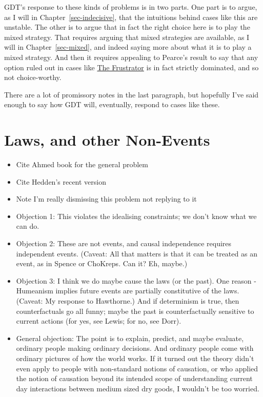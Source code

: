 \documentclass[
  12pt,
  letterpaper,
  DIV=11,
  numbers=noendperiod]{scrreprt}
\providecommand{\tightlist}{%
  \setlength{\itemsep}{0pt}\setlength{\parskip}{0pt}}\usepackage{longtable,booktabs,array}
\begin{document}
GDT's response to these kinds of problems is in two parts. One part is
to argue, as I will in Chapter~\ref{sec-indecisive}, that the intuitions
behind cases like this are unstable. The other is to argue that in fact
the right choice here is to play the mixed strategy. That requires
arguing that mixed strategies are available, as I will in
Chapter~\ref{sec-mixed}, and indeed saying more about what it is to play
a mixed strategy. And then it requires appealing to Pearce's result to
say that any option ruled out in cases like
\protect\hyperlink{tbl-frustrator}{The Frustrator} is in fact strictly
dominated, and so not choice-worthy.

There are a lot of promissory notes in the last paragraph, but hopefully
I've said enough to say how GDT will, eventually, respond to cases like
these.

\hypertarget{laws-and-other-non-events}{%
\section{Laws, and other Non-Events}\label{laws-and-other-non-events}}

\begin{itemize}
\tightlist
\item
  Cite Ahmed book for the general problem
\item
  Cite Hedden's recent version
\item
  Note I'm really dismissing this problem not replying to it
\item
  Objection 1: This violates the idealising constraints; we don't know
  what we can do.
\item
  Objection 2: These are not events, and causal independence requires
  independent events. (Caveat: All that matters is that it can be
  treated as an event, as in Spence or ChoKreps. Can it? Eh, maybe.)
\item
  Objection 3: I think we do maybe cause the laws (or the past). One
  reason - Humeanism implies future events are partially constitutive of
  the laws. (Caveat: My response to Hawthorne.) And if determinism is
  true, then counterfactuals go all funny; maybe the past is
  counterfactually sensitive to current actions (for yes, see Lewis; for
  no, see Dorr).
\item
  General objection: The point is to explain, predict, and maybe
  evaluate, ordinary people making ordinary decisions. And ordinary
  people come with ordinary pictures of how the world works. If it
  turned out the theory didn't even apply to people with non-standard
  notions of causation, or who applied the notion of causation beyond
  its intended scope of understanding current day interactions between
  medium sized dry goods, I wouldn't be too worried.
\end{itemize}
\end{document}
